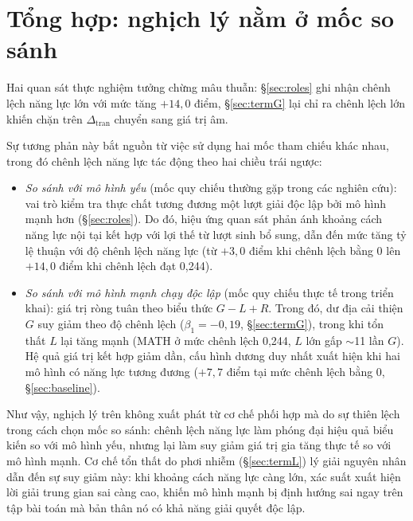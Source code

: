 \documentclass[12pt,a4paper]{article}
\newcommand{\dceil}{\Delta_{\mathrm{tran}}}
\begin{document}
\section{Tổng hợp: nghịch lý nằm ở mốc so sánh}\label{sec:synthesis}

Hai quan sát thực nghiệm tưởng chừng mâu thuẫn: \S\ref{sec:roles} ghi nhận chênh lệch năng lực
lớn với mức tăng $+14{,}0$ điểm, \S\ref{sec:termG} lại chỉ ra chênh lệch
lớn khiến chặn trên $\dceil$ chuyển sang giá trị âm.

Sự tương phản này bắt nguồn từ việc sử dụng hai mốc tham chiếu khác nhau, trong đó chênh lệch
năng lực tác động theo hai chiều trái ngược:
\begin{itemize}\itemsep2pt
\item \emph{So sánh với mô hình yếu} (mốc quy chiếu thường gặp trong các nghiên cứu): vai trò 
      kiểm tra thực chất tương đương một lượt giải độc lập bởi mô hình mạnh hơn (\S\ref{sec:roles}). 
      Do đó, hiệu ứng quan sát phản ánh khoảng cách năng lực nội tại kết hợp với 
      lợi thế từ lượt sinh bổ sung, dẫn đến mức tăng tỷ lệ thuận với độ chênh lệch năng lực (từ 
      $+3{,}0$ điểm khi chênh lệch bằng 0 lên $+14{,}0$ điểm khi chênh lệch đạt 0,244).
\item \emph{So sánh với mô hình mạnh chạy độc lập} (mốc quy chiếu thực tế trong triển khai):
      giá trị ròng tuân theo biểu thức $G - L + R$. Trong đó, dư địa cải thiện $G$ suy giảm
      theo độ chênh lệch ($\beta_1 = -0{,}19$, \S\ref{sec:termG}), trong khi tổn thất $L$ lại
      tăng mạnh (MATH ở mức chênh lệch 0,244, $L$ lớn gấp $\sim$11 lần $G$). Hệ quả
      giá trị kết hợp giảm dần, cấu hình dương duy nhất xuất hiện khi hai
      mô hình có năng lực tương đương ($+7{,}7$ điểm tại mức chênh lệch bằng 0,
      \S\ref{sec:baseline}).
\end{itemize}
Như vậy, nghịch lý trên không xuất phát từ cơ chế phối hợp mà do sự thiên lệch trong cách chọn
mốc so sánh: chênh lệch năng lực làm phóng đại hiệu quả biểu kiến so với mô hình yếu, nhưng lại
làm suy giảm giá trị gia tăng thực tế so với mô hình mạnh. Cơ chế tổn thất do phơi nhiễm
(\S\ref{sec:termL}) lý giải nguyên nhân dẫn đến sự suy giảm này: khi khoảng cách năng lực càng
lớn, xác suất xuất hiện lời giải trung gian sai càng cao, khiến mô hình mạnh bị định hướng sai
ngay trên tập bài toán mà bản thân nó có khả năng giải quyết độc lập.
\end{document}
